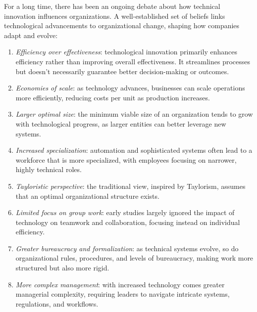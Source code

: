 \noindent For a long time, there has been an ongoing debate about how technical innovation influences organizations. 
A well-established set of beliefs links technological advancements to organizational change, shaping how companies adapt and evolve:
\begin{enumerate}
    \item \textit{Efficiency over effectiveness}: technological innovation primarily enhances efficiency rather than improving overall effectiveness. 
        It streamlines processes but doesn't necessarily guarantee better decision-making or outcomes.
    \item \textit{Economies of scale}: as technology advances, businesses can scale operations more efficiently, reducing costs per unit as production increases.
    \item \textit{Larger optimal size}: the minimum viable size of an organization tends to grow with technological progress, as larger entities can better leverage new systems.
    \item \textit{Increased specialization}: automation and sophisticated systems often lead to a workforce that is more specialized, with employees focusing on narrower, highly technical roles.
    \item \textit{Tayloristic perspective}: the traditional view, inspired by Taylorism, assumes that an optimal organizational structure exists.
    \item \textit{Limited focus on group work}: early studies largely ignored the impact of technology on teamwork and collaboration, focusing instead on individual efficiency.
    \item \textit{Greater bureaucracy and formalization}: as technical systems evolve, so do organizational rules, procedures, and levels of bureaucracy, making work more structured but also more rigid.
    \item \textit{More complex management}: with increased technology comes greater managerial complexity, requiring leaders to navigate intricate systems, regulations, and workflows.
\end{enumerate}


